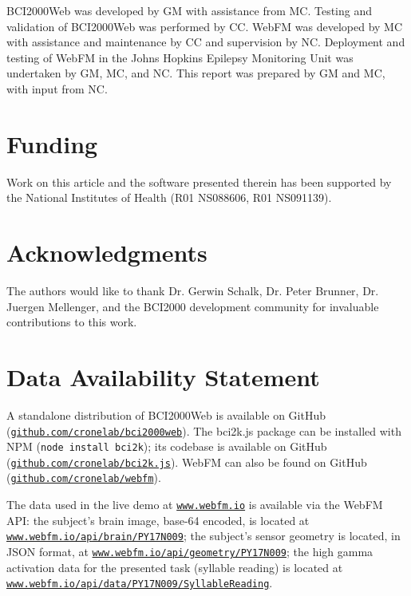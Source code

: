 \documentclass[utf8]{frontiersSCNS}
\begin{document}
BCI2000Web was developed by GM with assistance from MC. Testing and validation of BCI2000Web was performed by CC. WebFM was developed by MC with assistance and maintenance by CC and supervision by NC. Deployment and testing of WebFM in the Johns Hopkins Epilepsy Monitoring Unit was undertaken by GM, MC, and NC. This report was prepared by GM and MC, with input from NC.


\section*{Funding}

Work on this article and the software presented therein has been supported by the National Institutes of Health (R01 NS088606, R01 NS091139). 


\section*{Acknowledgments}

The authors would like to thank Dr. Gerwin Schalk, Dr. Peter Brunner, Dr. Juergen Mellenger, and the BCI2000 development community for invaluable contributions to this work.


\section*{Data Availability Statement}

A standalone distribution of BCI2000Web is available on GitHub (\href{https://github.com/cronelab/bci2000web}{\texttt{github.com/cronelab/bci2000web}}). The bci2k.js package can be installed with NPM (\texttt{node install bci2k}); its codebase is available on GitHub (\href{https://github.com/cronelab/bci2k.js}{\texttt{github.com/cronelab/bci2k.js}}). WebFM can also be found on GitHub (\href{https://github.com/cronelab/webfm}{\texttt{github.com/cronelab/webfm}}).

The data used in the live demo at \href{http://www.webfm.io}{\texttt{www.webfm.io}} is available via the WebFM API: the subject's brain image, base-64 encoded, is located at \href{http://www.webfm.io/api/brain/PY17N009}{\texttt{www.webfm.io/api/brain/PY17N009}}; the subject's sensor geometry is located, in JSON format, at \href{http://www.webfm.io/api/geometry/PY17N009}{\texttt{www.webfm.io/api/geometry/PY17N009}}; the high gamma activation data for the presented task (syllable reading) is located at \href{http://www.webfm.io/api/data/PY17N009/SyllableReading}{\texttt{www.webfm.io/api/data/PY17N009/SyllableReading}}.
\end{document}
